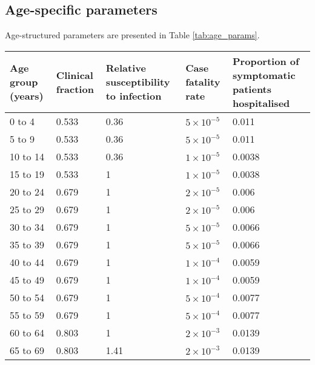 \subsection{Age-specific parameters}
Age-structured parameters are presented in Table \ref{tab:age_params}.

\begin{table}
    \begin{threeparttable}
    \begin{tabularx}{\textwidth}{| X | X | X | X | X |}
        \hline
        Age group (years) & Clinical fraction\tnote{a} & 
        Relative susceptibility to infection & Case fatality rate & 
        Proportion of symptomatic patients hospitalised \\
        \hline
        0 to 4   & 0.533 & 0.36 & $5\times10^{-5}$   & 0.011 \\
        \hline
        5 to 9   & 0.533 & 0.36 & $5\times10^{-5}$   & 0.011 \\
        \hline
        10 to 14 & 0.533 & 0.36 & $1\times10^{-5}$   & 0.0038 \\
        \hline
        15 to 19 & 0.533 & 1    & $1\times10^{-5}$   & 0.0038 \\
        \hline
        20 to 24 & 0.679 & 1    & $2\times10^{-5}$   & 0.006 \\
        \hline
        25 to 29 & 0.679 & 1    & $2\times10^{-5}$   & 0.006 \\
        \hline
        30 to 34 & 0.679 & 1    & $5\times10^{-5}$   & 0.0066 \\
        \hline
        35 to 39 & 0.679 & 1    & $5\times10^{-5}$   & 0.0066 \\
        \hline
        40 to 44 & 0.679 & 1    & $1\times10^{-4}$   & 0.0059 \\
        \hline
        45 to 49 & 0.679 & 1    & $1\times10^{-4}$   & 0.0059 \\
        \hline
        50 to 54 & 0.679 & 1    & $5\times10^{-4}$   & 0.0077 \\
        \hline
        55 to 59 & 0.679 & 1    & $5\times10^{-4}$   & 0.0077 \\
        \hline
        60 to 64 & 0.803 & 1    & $2\times10^{-3}$   & 0.0139 \\
        \hline
        65 to 69 & 0.803 & 1.41 & $2\times10^{-3}$   & 0.0139 \\

\end{tabularx}
\end{threeparttable}
\end{table}
